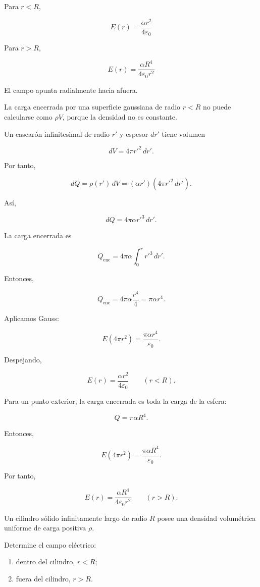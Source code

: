 \begin{respuesta}

Para \(r<R\),

\[
\boxed{
E(r)=\frac{\alpha r^2}{4\varepsilon_0}
}
\]

Para \(r>R\),

\[
\boxed{
E(r)=\frac{\alpha R^4}{4\varepsilon_0r^2}
}
\]

El campo apunta radialmente hacia afuera.

\end{respuesta}

\begin{explicacion}

La carga encerrada por una superficie gaussiana de radio \(r<R\) no puede
calcularse como \(\rho V\), porque la densidad no es constante.

Un cascarón infinitesimal de radio \(r'\) y espesor \(dr'\) tiene volumen

\[
dV=4\pi r'^2\,dr'.
\]

Por tanto,

\[
dQ=\rho(r')\,dV
=(\alpha r')(4\pi r'^2\,dr').
\]

Así,

\[
dQ=4\pi\alpha r'^3\,dr'.
\]

La carga encerrada es

\[
Q_{\text{enc}}
=
4\pi\alpha
\int_0^r r'^3\,dr'.
\]

Entonces,

\[
Q_{\text{enc}}
=
4\pi\alpha\frac{r^4}{4}
=
\pi\alpha r^4.
\]

Aplicamos Gauss:

\[
E(4\pi r^2)
=
\frac{\pi\alpha r^4}{\varepsilon_0}.
\]

Despejando,

\[
\boxed{
E(r)=\frac{\alpha r^2}{4\varepsilon_0}
\qquad(r<R)
}.
\]

Para un punto exterior, la carga encerrada es toda la carga de la esfera:

\[
Q=
\pi\alpha R^4.
\]

Entonces,

\[
E(4\pi r^2)
=
\frac{\pi\alpha R^4}{\varepsilon_0}.
\]

Por tanto,

\[
\boxed{
E(r)=\frac{\alpha R^4}{4\varepsilon_0r^2}
\qquad(r>R)
}.
\]

\end{explicacion}


\begin{ejercicio}

Un cilindro sólido infinitamente largo de radio \(R\) posee una densidad volumétrica
uniforme de carga positiva \(\rho\).

Determine el campo eléctrico:

\begin{enumerate}
    \item dentro del cilindro, \(r<R\);
    \item fuera del cilindro, \(r>R\).
\end{enumerate}

\end{ejercicio}

